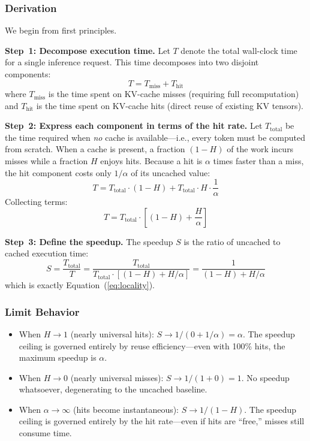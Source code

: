 \documentclass[11pt,a4paper]{article}
\begin{document}
\subsubsection{Derivation}

We begin from first principles.

\textbf{Step~1: Decompose execution time.}
Let $T$ denote the total wall-clock time for a single inference request. This time decomposes into two disjoint components:
\begin{equation}
T = T_{\mathrm{miss}} + T_{\mathrm{hit}}
\end{equation}
where $T_{\mathrm{miss}}$ is the time spent on KV-cache misses (requiring full recomputation) and $T_{\mathrm{hit}}$ is the time spent on KV-cache hits (direct reuse of existing KV tensors).

\textbf{Step~2: Express each component in terms of the hit rate.}
Let $T_{\mathrm{total}}$ be the time required when \emph{no} cache is available---i.e., every token must be computed from scratch. When a cache is present, a fraction $(1-H)$ of the work incurs misses while a fraction $H$ enjoys hits. Because a hit is $\alpha$ times faster than a miss, the hit component costs only $1/\alpha$ of its uncached value:
\begin{equation}
T = T_{\mathrm{total}} \cdot (1-H) + T_{\mathrm{total}} \cdot H \cdot \frac{1}{\alpha}
\end{equation}
Collecting terms:
\begin{equation}
T = T_{\mathrm{total}} \cdot \left[(1-H) + \frac{H}{\alpha}\right]
\end{equation}

\textbf{Step~3: Define the speedup.}
The speedup $S$ is the ratio of uncached to cached execution time:
\begin{equation}
S = \frac{T_{\mathrm{total}}}{T} = \frac{T_{\mathrm{total}}}{T_{\mathrm{total}} \cdot \left[(1-H) + H/\alpha\right]} = \frac{1}{(1-H) + H/\alpha}
\end{equation}
which is exactly Equation~(\ref{eq:locality}).

\subsubsection{Limit Behavior}

\begin{itemize}[nosep]
\item When $H \to 1$ (nearly universal hits): $S \to 1/(0 + 1/\alpha) = \alpha$. The speedup ceiling is governed entirely by reuse efficiency---even with 100\% hits, the maximum speedup is $\alpha$.

\item When $H \to 0$ (nearly universal misses): $S \to 1/(1 + 0) = 1$. No speedup whatsoever, degenerating to the uncached baseline.

\item When $\alpha \to \infty$ (hits become instantaneous): $S \to 1/(1-H)$. The speedup ceiling is governed entirely by the hit rate---even if hits are ``free,'' misses still consume time.
\end{itemize}
\end{document}
